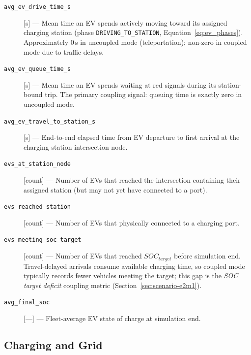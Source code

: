 \begin{description}

\item[\texttt{avg\_ev\_drive\_time\_s}] [s] ---
  Mean time an EV spends actively moving toward its assigned charging station
  (phase \texttt{DRIVING\_TO\_STATION}, Equation~\ref{eq:ev_phases}).
  Approximately 0\,s in uncoupled mode (teleportation); non-zero in coupled
  mode due to traffic delays.

\item[\texttt{avg\_ev\_queue\_time\_s}] [s] ---
  Mean time an EV spends waiting at red signals during its station-bound trip.
  The primary coupling signal: queuing time is exactly zero in uncoupled mode.

\item[\texttt{avg\_ev\_travel\_to\_station\_s}] [s] ---
  End-to-end elapsed time from EV departure to first arrival at the charging
  station intersection node.

\item[\texttt{evs\_at\_station\_node}] [count] ---
  Number of EVs that reached the intersection containing their assigned station
  (but may not yet have connected to a port).

\item[\texttt{evs\_reached\_station}] [count] ---
  Number of EVs that physically connected to a charging port.

\item[\texttt{evs\_meeting\_soc\_target}] [count] ---
  Number of EVs that reached $SOC_{target}$ before simulation end.
  Travel-delayed arrivals consume available charging time, so coupled mode
  typically records fewer vehicles meeting the target; this gap is the
  \emph{SOC target deficit} coupling metric
  (Section~\ref{sec:scenario-e2m1}).

\item[\texttt{avg\_final\_soc}] [---] ---
  Fleet-average EV state of charge at simulation end.

\end{description}

\subsection*{Charging and Grid}

